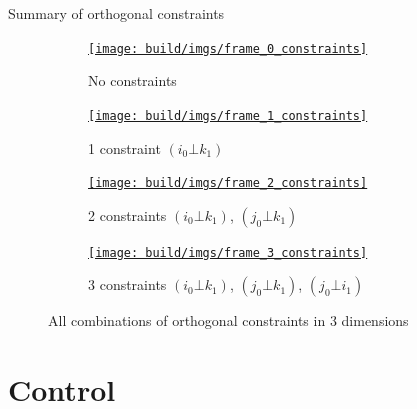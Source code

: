 \documentclass[10pt, xcolor={usenames, dvipsnames}]{beamer}
\begin{document}
        \begin{frame}{Summary of orthogonal constraints}
            \begin{figure}
                \begin{subfigure}[t]{0.24\textwidth}
                    \centering
                    \href{run:frame_0_constraints.mp4?autostart&loop}{\texttt{[image: build/imgs/frame\_0\_constraints]}}
                    \caption{No constraints}
                    \label{fig:constraints_0}
                \end{subfigure}
                \hfill
                \begin{subfigure}[t]{0.24\textwidth}
                    \centering
                    \href{run:frame_1_constraints.mp4?autostart&loop}{\texttt{[image: build/imgs/frame\_1\_constraints]}}
                    \caption{1 constraint $(i_0 \bot k_1)$}
                    \label{fig:constraints_1}
                \end{subfigure}
                \hfill
                \begin{subfigure}[t]{0.24\textwidth}
                    \centering
                    \href{run:frame_2_constraints.mp4?autostart&loop}{\texttt{[image: build/imgs/frame\_2\_constraints]}}
                    \caption{2 constraints $(i_0 \bot k_1)$, $(j_0 \bot k_1)$}
                    \label{fig:constraints_2}
                \end{subfigure}
                \hfill
                \begin{subfigure}[t]{0.24\textwidth}
                    \centering
                    \href{run:frame_3_constraints.mp4?autostart&loop}{\texttt{[image: build/imgs/frame\_3\_constraints]}}
                    \caption{3 constraints $(i_0 \bot k_1)$, $(j_0 \bot k_1)$, $(j_0 \bot i_1)$}
                    \label{fig:constraints_3}
                \end{subfigure}
                \caption{All combinations of orthogonal constraints in 3 dimensions}
            \end{figure}
        \end{frame}




    \section{Control}
\end{document}
